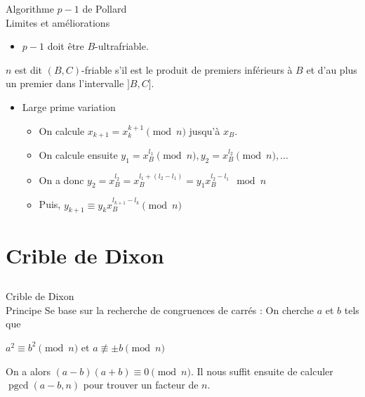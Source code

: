 \documentclass[utf8,10pt,french]{beamer}
\DeclareMathOperator{\pgcd}{pgcd}
\begin{document}
\begin{frame}{Algorithme $p - 1$ de Pollard \\ Limites et améliorations}
\begin{itemize}
\item $p - 1$ doit être $B$-ultrafriable.
\end{itemize} \pause
\begin{definition}
$n$ est dit $(B, C)$-friable s’il est le produit de premiers inférieurs à $B$ et d’au plus un premier dans l’intervalle $]B, C].$ \pause
\end{definition}
\begin{itemize}
\item Large prime variation \pause
\begin{itemize}
\item On calcule $x_{k + 1} = x_k^{k+1} \pmod n$ jusqu'à $x_B.$ \pause
\item On calcule ensuite $y_1 = x_B^{l_1} \pmod n, y_2 = x_B^{l_2} \pmod n, ...$ \pause
\item On a donc  $y_2 = x_B^{l_2} = x_B^{l_1 + (l_2 - l_1)} = y_1 x_B^{l_2 - l_1} \mod n$
\item Puis, $y_{k + 1} \equiv  y_kx_B^{l_{k+1} - l_k} \pmod n$
\end{itemize}
\end{itemize}
\end{frame}

\section{Crible de Dixon}
\subsection{}
\begin{frame}{Crible de Dixon \\ Principe}
Se base sur la recherche de congruences de carrés :
On cherche $a$ et $b$ tels que
\begin{center}
$a^2 \equiv b^2 \pmod n$ et $a \not\equiv \pm{b} \pmod n$
\end{center} \pause
On a alors $(a - b)(a + b) \equiv 0 \pmod n.$
Il nous suffit ensuite de calculer $\pgcd(a - b, n)$ pour trouver un facteur de $n.$
\end{frame}
\end{document}
